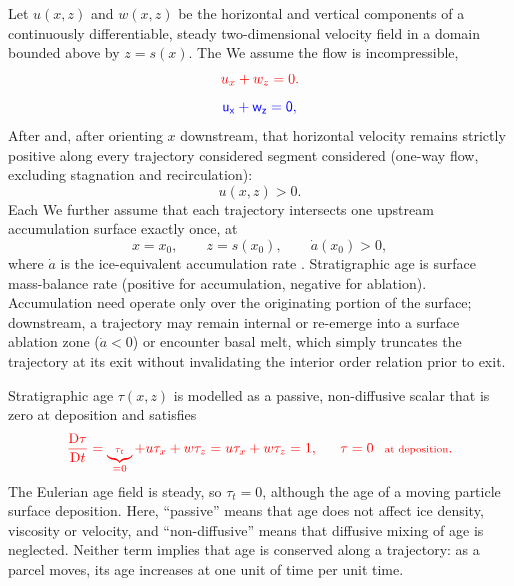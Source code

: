 \documentclass[review]{igs}
\providecommand{\DIFadd}[1]{{\protect\color{blue} \sf #1}} %
\providecommand{\DIFdel}[1]{{\protect\color{red} \scriptsize #1}} %
\providecommand{\DIFaddbegin}{} %
\providecommand{\DIFaddend}{} %
\providecommand{\DIFdelbegin}{} %
\providecommand{\DIFdelend}{} %
\newcommand{\DIFscaledelfig}{0.5}
\newlength{\DIFdelgraphicswidth} %
\newlength{\DIFdelgraphicsheight} %
\newcommand{\DIFaddincludegraphics}[2][]{{\color{blue}\fbox{\DIFOincludegraphics[#1]{#2}}}} %
\newcommand{\DIFdelincludegraphics}[2][]{%
\sbox{\DIFdelgraphicsbox}{\DIFOincludegraphics[#1]{#2}}%
\settoboxwidth{\DIFdelgraphicswidth}{\DIFdelgraphicsbox} %
\settoboxtotalheight{\DIFdelgraphicsheight}{\DIFdelgraphicsbox} %
\scalebox{\DIFscaledelfig}{%
\parbox[b]{\DIFdelgraphicswidth}{\usebox{\DIFdelgraphicsbox}\\[-\baselineskip] \rule{\DIFdelgraphicswidth}{0em}}\llap{\resizebox{\DIFdelgraphicswidth}{\DIFdelgraphicsheight}{%
\setlength{\unitlength}{\DIFdelgraphicswidth}%
\begin{picture}(1,1)%
\thicklines\linethickness{2pt} %
{\color[rgb]{1,0,0}\put(0,0){\framebox(1,1){}}}%
{\color[rgb]{1,0,0}\put(0,0){\line( 1,1){1}}}%
{\color[rgb]{1,0,0}\put(0,1){\line(1,-1){1}}}%
\end{picture}%
}\hspace*{3pt}}} %
} %
\DeclareRobustCommand{\DIFaddbegin}{\DIFOaddbegin \let\includegraphics\DIFaddincludegraphics} %
\DeclareRobustCommand{\DIFaddend}{\DIFOaddend \let\includegraphics\DIFOincludegraphics} %
\DeclareRobustCommand{\DIFdelbegin}{\DIFOdelbegin \let\includegraphics\DIFdelincludegraphics} %
\DeclareRobustCommand{\DIFdelend}{\DIFOaddend \let\includegraphics\DIFOincludegraphics} %
\begin{document}
\DIFaddend Let \(u(x,z)\) and \(w(x,z)\) be the horizontal and vertical components of a continuously differentiable, steady two-dimensional velocity field in a domain bounded above by \(z=s(x)\). \DIFdelbegin \DIFdel{The }\DIFdelend \DIFaddbegin \DIFadd{We assume the }\DIFaddend flow is incompressible,
\DIFdelbegin \begin{displaymath}
\DIFdel{u_x+w_z=0.
}\end{displaymath}%
\DIFdelend \DIFaddbegin \begin{equation}
\DIFadd{u_x+w_z=0,
\label{eq:incompressibility}
}\end{equation}\DIFaddend 
\DIFdelbegin \DIFdel{After }\DIFdelend \DIFaddbegin \DIFadd{and, after }\DIFaddend orienting \(x\) downstream, \DIFaddbegin \DIFadd{that }\DIFaddend horizontal velocity remains \DIFaddbegin \DIFadd{strictly }\DIFaddend positive along every trajectory \DIFdelbegin \DIFdel{considered}\DIFdelend \DIFaddbegin \DIFadd{segment considered (one-way flow, excluding stagnation and recirculation)}\DIFaddend :
\begin{equation}
u(x,z)>0.
\label{eq:forwardflow}
\end{equation}
\DIFdelbegin \DIFdel{Each }\DIFdelend \DIFaddbegin \DIFadd{We further assume that each }\DIFaddend trajectory intersects one upstream accumulation surface exactly once, at
\begin{equation}
x=x_0,
\qquad z=s(x_0),
\qquad \dot a(x_0)>0,
\label{eq:surfaceorigin}
\end{equation}
where \(\dot a\) is the ice-equivalent \DIFdelbegin \DIFdel{accumulation rate . Stratigraphic age is }\DIFdelend \DIFaddbegin \DIFadd{surface mass-balance rate (positive for accumulation, negative for ablation). Accumulation need operate only over the originating portion of the surface; downstream, a trajectory may remain internal or re-emerge into a surface ablation zone (\(\dot a<0\)) or encounter basal melt, which simply truncates the trajectory at its exit without invalidating the interior order relation prior to exit.
}

\DIFadd{Stratigraphic age \(\tau(x,z)\) is modelled as }\DIFaddend a passive, non-diffusive scalar that is zero at \DIFdelbegin \DIFdel{deposition and satisfies
}\begin{displaymath}
\DIFdel{\frac{\mathrm{D}\tau}{\mathrm{D}t}
=\underbrace{\tau_t}_{=0}+u\tau_x+w\tau_z
=u\tau_x+w\tau_z
=1,
\qquad \tau=0\quad\text{at deposition}.
}\end{displaymath}%
\DIFdel{The Eulerian age field is steady, so \(\tau_t=0\), although the age of a moving particle }\DIFdelend \DIFaddbegin \DIFadd{surface deposition. Here, ``passive'' means that age does not affect ice density, viscosity or velocity, and ``non-diffusive'' means that diffusive mixing of age is neglected. Neither term implies that age is conserved along a trajectory: as a parcel moves, its age }\DIFaddend increases at one unit of time per unit \DIFdelbegin \DIFdel{time.
}%
\end{document}
